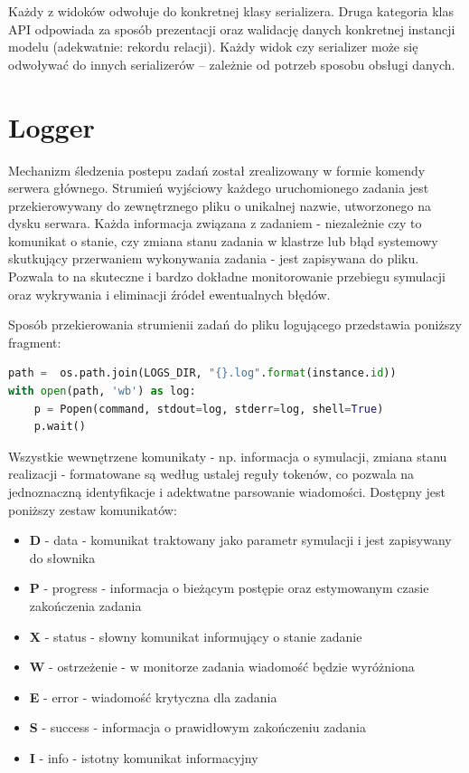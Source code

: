 \documentclass[a4paper,onecolumn,oneside,12pt]{memoir}
\begin{document}
{Każdy z widoków odwołuje do konkretnej klasy serializera. Druga kategoria klas API
odpowiada za sposób prezentacji oraz walidację danych konkretnej instancji modelu
(adekwatnie: rekordu relacji). Każdy widok czy serializer może się odwoływać do
innych serializerów – zależnie od potrzeb sposobu obsługi danych.

\section{Logger}
\quad \quad Mechanizm śledzenia postepu zadań został zrealizowany w formie komendy
serwera głównego. Strumień wyjściowy każdego uruchomionego zadania jest przekierowywany
do zewnętrznego pliku o unikalnej nazwie, utworzonego na dysku serwara. Każda informacja
związana z zadaniem - niezależnie czy to komunikat o stanie, czy zmiana stanu zadania
w klastrze lub błąd systemowy skutkujący przerwaniem wykonywania zadania - jest zapisywana
do pliku. Pozwala to na skuteczne i bardzo dokładne monitorowanie przebiegu symulacji
oraz wykrywania i eliminacji źródeł ewentualnych błędów.

Sposób przekierowania strumienii zadań do pliku logującego przedstawia poniższy fragment:

\begin{lstlisting}[language=Python, caption=Tworzenie logu]
path =  os.path.join(LOGS_DIR, "{}.log".format(instance.id))
with open(path, 'wb') as log:
	p = Popen(command, stdout=log, stderr=log, shell=True)
	p.wait()
\end{lstlisting}

Wszystkie wewnętrzene komunikaty - np. informacja o symulacji, zmiana stanu realizacji -
formatowane są według ustalej reguły tokenów, co pozwala na jednoznaczną identyfikacje
i adektwatne parsowanie wiadomości. Dostępny jest poniższy zestaw komunikatów:
\begin{itemize}
\item \textbf{D} - data - komunikat traktowany jako parametr symulacji i jest zapisywany
do słownika
\item \textbf{P} - progress - informacja o bieżącym postępie oraz estymowanym czasie
zakończenia zadania
\item \textbf{X} - status - słowny komunikat informujący o stanie zadanie
\item \textbf{W} - ostrzeżenie - w monitorze zadania wiadomość będzie wyróżniona
\item \textbf{E} - error - wiadomość krytyczna dla zadania
\item \textbf{S} - success - informacja o prawidłowym zakończeniu zadania
\item \textbf{I} - info - istotny komunikat informacyjny
\end{itemize}

}
\end{document}
